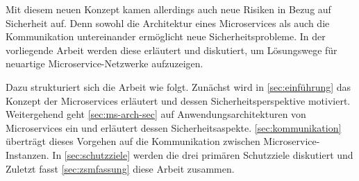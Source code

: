 \documentclass[12pt]{article}
\begin{document}
Mit diesem neuen Konzept kamen allerdings auch neue Risiken in Bezug auf Sicherheit auf. Denn sowohl die Architektur eines Microservices als auch die Kommunikation untereinander ermöglicht neue Sicherheitsprobleme. In der vorliegende Arbeit werden diese erläutert und diskutiert, um Lösungswege für neuartige Microservice-Netzwerke aufzuzeigen.

Dazu strukturiert sich die Arbeit wie folgt. Zunächst wird in \autoref{sec:einführung} das Konzept der Microservices erläutert und dessen Sicherheitsperspektive motiviert. Weitergehend geht \autoref{sec:ms-arch-sec} auf Anwendungsarchitekturen von Microservices ein und erläutert dessen Sicherheitsaspekte. \autoref{sec:kommunikation} überträgt dieses Vorgehen auf die Kommunikation zwischen Microservice-Instanzen. In \autoref{sec:schutzziele} werden die drei primären Schutzziele diskutiert und  Zuletzt fasst \autoref{sec:zsmfassung} diese Arbeit zusammen.









\nocite{*}


\end{document}
